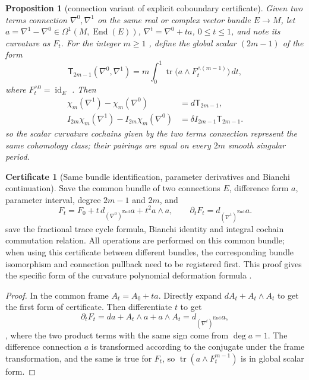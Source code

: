 \documentclass[12pt,a4paper,openany,notitlepage]{report}
\theoremstyle{plain}
\newtheorem{proposition}[theorem]{Proposition}
\theoremstyle{definition}
\newtheorem*{certificate}{Certificate}
\theoremstyle{remark}
\begin{document}
\begin{CJK*}
\begin{proposition}
[connection variant of explicit coboundary certificate]\label{exp:geo:prop:transgression}
Given two terms connection $\nabla^0,\nabla^1$ on the same real or complex vector bundle $E\to M$, let $a=\nabla^1-\nabla^0\in\Omega^1(M,\operatorname{End}(E))$, $\nabla^t=\nabla^0+t a$, $0\le t\le1$, and note its curvature as $F_t$. For the integer $m\ge1$ , define the global scalar $(2m-1)$ of the form \[
\mathsf T_{2m-1}(\nabla^0,\nabla^1)
=m\int_0^1\operatorname{tr}\bigl(a\wedge F_t^{\wedge(m-1)}\bigr)\,dt,
\] where $F_t^{\wedge0}=\operatorname{id}_E$ . Then \begin{align}
\label{exp:geo:eq:transgression-form}
\chi_m(\nabla^1)-\chi_m(\nabla^0)&=d\mathsf T_{2m-1},\\
\label{exp:geo:eq:transgression-cochain}
I_{2m}\chi_m(\nabla^1)-I_{2m}\chi_m(\nabla^0)
&=\delta I_{2m-1}\mathsf T_{2m-1}.
\end{align} so the scalar curvature cochains given by the two terms connection represent the same cohomology class; their pairings are equal on every $2m$ smooth singular period.\end{proposition}
\begin{certificate}
[Same bundle identification, parameter derivatives and Bianchi continuation]Save the common bundle of two connections $E$, difference form $a$, parameter interval, degree $2m-1$ and $2m$, and \[
F_t=F_0+t\,d_{(\nabla^0)^{\operatorname{End}}}a+t^2a\wedge a,
\qquad
\partial_tF_t=d_{(\nabla^t)^{\operatorname{End}}}a.
\] save the fractional trace cycle formula, Bianchi identity and integral cochain commutation relation. All operations are performed on this common bundle; when using this certificate between different bundles, the corresponding bundle isomorphism and connection pullback need to be registered first. This proof gives the specific form of the curvature polynomial deformation formula \cite{ExtBottTu,ExtKobayashiNomizu}.\end{certificate}
\begin{proof}
In the common frame $A_t=A_0+t a$. Directly expand $dA_t+A_t\wedge A_t$ to get the first form of certificate. Then differentiate $t$ to get \[
\partial_tF_t
=da+A_t\wedge a+a\wedge A_t
=d_{(\nabla^t)^{\operatorname{End}}}a,
\], where the two product terms with the same sign come from $\deg a=1$. The difference connection $a$ is transformed according to the conjugate under the frame transformation, and the same is true for $F_t$, so $\operatorname{tr}(a\wedge F_t^{m-1})$ is in global scalar form.


\end{proof}
\end{CJK*}
\end{document}

